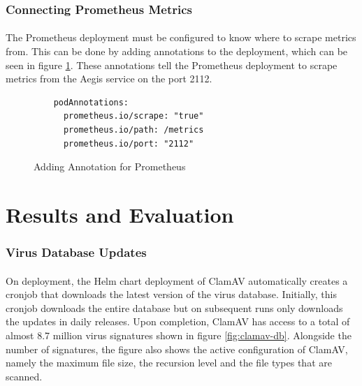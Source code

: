 \documentclass[12pt, conference, final, a4paper, onecolumn, compsoc]{IEEEtran}
\begin{document}
\subsubsection*{Connecting Prometheus Metrics}
\paragraph{}
The Prometheus deployment must be configured to know where to scrape metrics
from. This can be done by adding annotations to the deployment, which can be
seen in figure \ref{fig:prometheus-annotations}. These annotations tell the
Prometheus deployment to scrape metrics from the Aegis service on the port 2112.

\begin{figure}[H]
\begin{lstlisting}
    podAnnotations:
      prometheus.io/scrape: "true"
      prometheus.io/path: /metrics
      prometheus.io/port: "2112"
\end{lstlisting}
  \caption{Adding Annotation for Prometheus}
  \label{fig:prometheus-annotations}
\end{figure}

\section{Results and Evaluation}

\subsubsection*{Virus Database Updates}
\paragraph{}
On deployment, the Helm chart deployment of ClamAV automatically creates a
cronjob that downloads the latest version of the virus database. Initially, this
cronjob downloads the entire database but on subsequent runs only downloads the
updates in daily releases. Upon completion, ClamAV has access to a total of
almost 8.7 million virus signatures shown in figure \ref{fig:clamav-db}.
Alongside the number of signatures, the figure also shows the active
configuration of ClamAV, namely the maximum file size, the recursion level and
the file types that are scanned.
\end{document}

